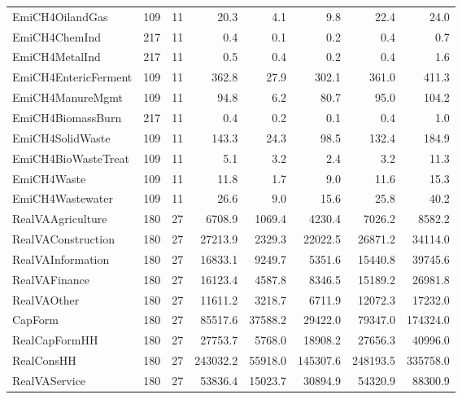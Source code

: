 {\begin{tabular}[t]{lrrrrrrr}
EmiCH4OilandGas & 109 & 11 & \num{20.3} & \num{4.1} & \num{9.8} & \num{22.4} & \num{24.0}\\
EmiCH4ChemInd & 217 & 11 & \num{0.4} & \num{0.1} & \num{0.2} & \num{0.4} & \num{0.7}\\
EmiCH4MetalInd & 217 & 11 & \num{0.5} & \num{0.4} & \num{0.2} & \num{0.4} & \num{1.6}\\
EmiCH4EntericFerment & 109 & 11 & \num{362.8} & \num{27.9} & \num{302.1} & \num{361.0} & \num{411.3}\\
EmiCH4ManureMgmt & 109 & 11 & \num{94.8} & \num{6.2} & \num{80.7} & \num{95.0} & \num{104.2}\\
EmiCH4BiomassBurn & 217 & 11 & \num{0.4} & \num{0.2} & \num{0.1} & \num{0.4} & \num{1.0}\\
EmiCH4SolidWaste & 109 & 11 & \num{143.3} & \num{24.3} & \num{98.5} & \num{132.4} & \num{184.9}\\
EmiCH4BioWasteTreat & 109 & 11 & \num{5.1} & \num{3.2} & \num{2.4} & \num{3.2} & \num{11.3}\\
EmiCH4Waste & 109 & 11 & \num{11.8} & \num{1.7} & \num{9.0} & \num{11.6} & \num{15.3}\\
EmiCH4Wastewater & 109 & 11 & \num{26.6} & \num{9.0} & \num{15.6} & \num{25.8} & \num{40.2}\\
RealVAAgriculture & 180 & 27 & \num{6708.9} & \num{1069.4} & \num{4230.4} & \num{7026.2} & \num{8582.2}\\
RealVAConstruction & 180 & 27 & \num{27213.9} & \num{2329.3} & \num{22022.5} & \num{26871.2} & \num{34114.0}\\
RealVAInformation & 180 & 27 & \num{16833.1} & \num{9249.7} & \num{5351.6} & \num{15440.8} & \num{39745.6}\\
RealVAFinance & 180 & 27 & \num{16123.4} & \num{4587.8} & \num{8346.5} & \num{15189.2} & \num{26981.8}\\
RealVAOther & 180 & 27 & \num{11611.2} & \num{3218.7} & \num{6711.9} & \num{12072.3} & \num{17232.0}\\
CapForm & 180 & 27 & \num{85517.6} & \num{37588.2} & \num{29422.0} & \num{79347.0} & \num{174324.0}\\
RealCapFormHH & 180 & 27 & \num{27753.7} & \num{5768.0} & \num{18908.2} & \num{27656.3} & \num{40996.0}\\
RealConsHH & 180 & 27 & \num{243032.2} & \num{55918.0} & \num{145307.6} & \num{248193.5} & \num{335758.0}\\
RealVAService & 180 & 27 & \num{53836.4} & \num{15023.7} & \num{30894.9} & \num{54320.9} & \num{88300.9}\\

\end{tabular}}
